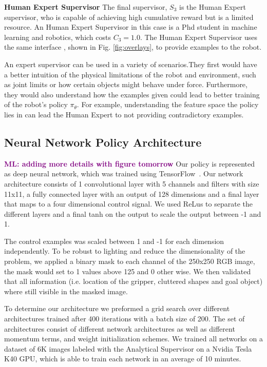 \documentclass[10pt, conference]{ieeeconf}      %
\newcommand{\mlnote}[1]{\ifthenelse{ \boolean{include-notes}}%
 {\textcolor{purple}{\textbf{ML: #1}}}{}}
\begin{document}
\noindent \textbf{Human Expert Supervisor} The final supervisor, $S_3$ is the Human Expert supervisor, who is capable of achieving high cumulative reward but is a limited resource. An Human Expert Supervisor in this case is a Phd student in machine learning and robotics, which costs $C_3=1.0$. The Human Expert Supervisor uses the same interface , shown in Fig. \ref{fig:overlays}, to provide examples to the robot.  

An expert supervisor can be used in a variety of scenarios.They first would have a better intuition of the physical limitations of the robot and environment, such as joint limits or how certain objects might behave under force. Furthermore, they would also understand how the examples given could lead to better training of the robot's policy $\pi_\theta$. For example, understanding the feature space the policy lies in can lead the Human Expert to not providing contradictory examples. 



\subsection{Neural Network Policy Architecture}
\mlnote{adding more details with figure tomorrow}
Our policy is represented as deep neural network, which was trained using TensorFlow~\cite{tensorflow2015-whitepaper}. Our network architecture consists of 1 convolutional layer with 5 channels and filters with size 11x11, a fully connected layer with an output of 128 dimensions and a final layer that maps to a four dimensional control signal. We used ReLus to separate the different layers and a final tanh on the output to scale the output between -1 and 1. 

The control examples was scaled between 1 and -1 for each dimension independently. To be robust to lighting and reduce the dimensionality of the problem, we applied a binary mask to each channel of the 250x250 RGB image, the mask would set to 1 values above 125 and 0 other wise.  We then validated that all information (i.e. location of the gripper, cluttered shapes and goal object) where still visible in the masked image. 

To determine our architecture we preformed a grid search over different architectures  trained after 400 iterations with a batch size of 200. The set of architectures consist of different network architectures as well as different momentum terms, and weight initialization schemes. We trained all networks on a dataset of 6K images labeled with the Analytical Supervisor on a Nvidia Tesla K40 GPU, which is able to train each network in an average of 10 minutes.  
\end{document}
